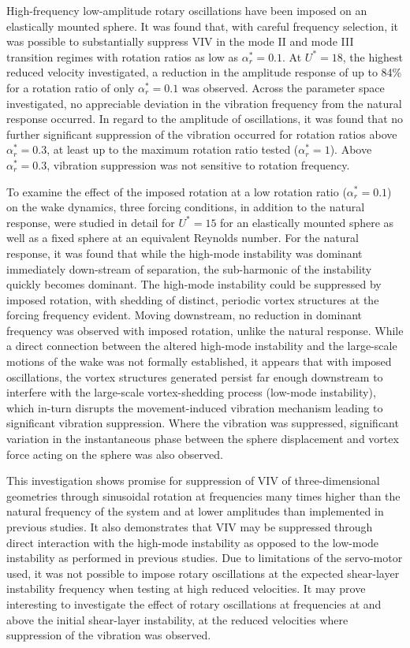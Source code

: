 \documentclass[3p]{elsarticle}
\newcommand{\Ustar}{\ensuremath{U^{*}}}
\newcommand{\velrat}{\ensuremath{\alpha_r^*}}
\begin{document}
High-frequency low-amplitude rotary oscillations have been imposed on
an elastically mounted sphere. It was found that, with careful
frequency selection, it was possible to substantially suppress VIV in
the mode II and mode III transition regimes with rotation ratios as
low as $\velrat=0.1$. At $\Ustar=18$, the highest reduced velocity
investigated, a reduction in the amplitude response of up to 84\% for
a rotation ratio of only $\velrat=0.1$ was observed. Across the
parameter space investigated, no appreciable deviation in the
vibration frequency from the natural response occurred. In regard to
the amplitude of oscillations, it was found that no further
significant suppression of the vibration occurred for rotation ratios
above $\velrat=0.3$, at least up to the maximum rotation ratio tested
($\velrat=1$). Above $\velrat=0.3$, vibration suppression was not
sensitive to rotation frequency.

To examine the effect of the imposed rotation at a low rotation ratio
($\velrat=0.1$) on the wake dynamics, three forcing conditions, in
addition to the natural response, were studied in detail for
$\Ustar=15$ for an elastically mounted sphere as well as a fixed
sphere at an equivalent Reynolds number. For the natural response, it
was found that while the high-mode instability was dominant
immediately down-stream of separation, the sub-harmonic of the
instability quickly becomes dominant. The
high-mode instability could be suppressed by imposed rotation, with
shedding of distinct, periodic vortex structures at the forcing
frequency evident. Moving downstream, no reduction in dominant
frequency was observed with imposed rotation, unlike the natural
response. While a direct connection between the altered high-mode
instability and the large-scale motions of the wake was not formally
established, it appears that with imposed oscillations, the vortex
structures generated persist far enough downstream to interfere with
the large-scale vortex-shedding process (low-mode instability), which
in-turn disrupts the movement-induced vibration mechanism leading to
significant vibration suppression. Where the vibration was suppressed,
significant variation in the instantaneous phase between the sphere
displacement and vortex force acting on the sphere was also observed.

This investigation shows promise for suppression of VIV of
three-dimensional geometries through sinusoidal rotation at
frequencies many times higher than the natural frequency of the system
and at lower amplitudes than implemented in previous studies. It also
demonstrates that VIV may be suppressed through direct interaction
with the high-mode instability as opposed to the low-mode instability
as performed in previous studies. Due to limitations of the
servo-motor used, it was not possible to impose rotary oscillations at
the expected shear-layer instability frequency when testing at high
reduced velocities. It may prove interesting to investigate the effect
of rotary oscillations at frequencies at and above the initial
shear-layer instability, at the reduced velocities where suppression
of the vibration was observed.
\end{document}
